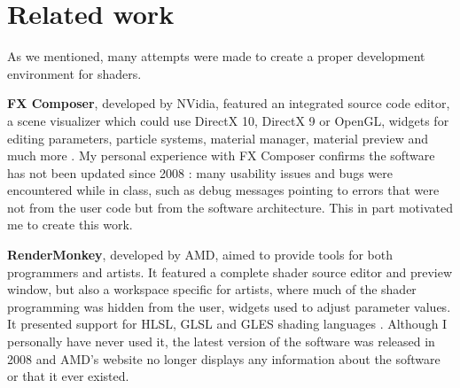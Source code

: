 \section{Related work}
As we mentioned, many attempts were made to create a proper development environment for shaders.

\textbf{FX Composer}, developed by NVidia, featured an integrated source code editor, a scene visualizer which could use DirectX 10, DirectX 9 or OpenGL, widgets for editing parameters, particle systems, material manager, material preview and much more \cite{fxcomposer}. My personal experience with FX Composer confirms the software has not been updated since 2008 \cite{fxcomposer_release_notes}: many usability issues and bugs were encountered while in class, such as debug messages pointing to errors that were not from the user code but from the software architecture. This in part motivated me to create this work.

\textbf{RenderMonkey}, developed by AMD, aimed to provide tools for both programmers and artists. It featured a complete shader source editor and preview window, but also a workspace specific for artists, where much of the shader programming was hidden from the user, widgets used to adjust parameter values. It presented support for HLSL, GLSL and GLES shading languages \cite{rendermonkey}. Although I personally have never used it, the latest version of the software was released in 2008 \cite{rendermonkey_release_notes} and AMD's website no longer displays any information about the software or that it ever existed.
